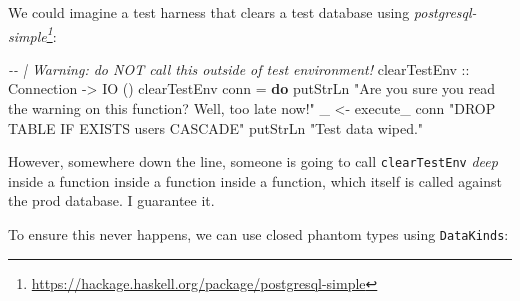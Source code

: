 \documentclass[]{article}
\newenvironment{Shaded}{}{}
\newcommand{\CommentTok}[1]{\textcolor[rgb]{0.38,0.63,0.69}{\textit{#1}}}
\newcommand{\DataTypeTok}[1]{\textcolor[rgb]{0.56,0.13,0.00}{#1}}
\newcommand{\FunctionTok}[1]{\textcolor[rgb]{0.02,0.16,0.49}{#1}}
\newcommand{\KeywordTok}[1]{\textcolor[rgb]{0.00,0.44,0.13}{\textbf{#1}}}
\newcommand{\NormalTok}[1]{#1}
\newcommand{\OperatorTok}[1]{\textcolor[rgb]{0.40,0.40,0.40}{#1}}
\newcommand{\OtherTok}[1]{\textcolor[rgb]{0.00,0.44,0.13}{#1}}
\newcommand{\StringTok}[1]{\textcolor[rgb]{0.25,0.44,0.63}{#1}}
\renewcommand{\href}[2]{#2\footnote{\url{#1}}}
\begin{document}
We could imagine a test harness that clears a test database using
\emph{\href{https://hackage.haskell.org/package/postgresql-simple}{postgresql-simple}}:

\begin{Shaded}
\begin{Highlighting}[]
\CommentTok{{-}{-} | Warning: do NOT call this outside of test environment!}
\OtherTok{clearTestEnv ::} \DataTypeTok{Connection} \OtherTok{{-}\textgreater{}} \DataTypeTok{IO}\NormalTok{ ()}
\NormalTok{clearTestEnv conn }\OtherTok{=} \KeywordTok{do}
  \FunctionTok{putStrLn} \StringTok{"Are you sure you read the warning on this function? Well, too late now!"}
\NormalTok{  \_ }\OtherTok{\textless{}{-}}\NormalTok{ execute\_ conn }\StringTok{"DROP TABLE IF EXISTS users CASCADE"}
  \FunctionTok{putStrLn} \StringTok{"Test data wiped."}
\end{Highlighting}
\end{Shaded}

However, somewhere down the line, someone is going to call \texttt{clearTestEnv}
\emph{deep} inside a function inside a function inside a function, which itself
is called against the prod database. I guarantee it.

To ensure this never happens, we can use closed phantom types using
\texttt{DataKinds}:

\begin{Shaded}
\end{Shaded}
\end{document}
